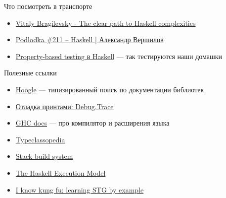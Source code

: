     \begin{frame}{Что посмотреть в транспорте}
        \begin{itemize}
            \item \href{https://youtu.be/n3H_YipBDrY?si=s1_yS-4r8JcZiuUi}{\color{blue} Vitaly Bragilevsky - The clear path to Haskell complexities}
            \item \href{https://youtu.be/sGFdbpGamWk}{\color{blue} Podlodka \#211 – Haskell | Александр Вершилов}
            \item \href{https://youtu.be/ndfLLz-wehE?si=A53s_VYg-UWJVWkW}{\color{blue}  Property-based testing в Haskell} --- так тестируются наши домашки
        \end{itemize}
    \end{frame}

    \begin{frame}{Полезные ссылки}
        \begin{itemize}
            \item \href{https://hoogle.haskell.org/}{\color{blue} Hoogle} --- типизированный поиск по документации библиотек
            \item \href{https://hackage.haskell.org/package/base-4.18.1.0/docs/Debug-Trace.html}{\color{blue} Отладка принтами: Debug.Trace}
            \item \href{https://ghc.gitlab.haskell.org/ghc/doc/users_guide/index.html}{\color{blue} GHC docs} --- про компилятор и расширения языка
            \item \href{https://wiki.haskell.org/Typeclassopedia}{\color{blue} Typeclassopedia}
            \item \href{https://docs.haskellstack.org/en/stable/}{\color{blue} Stack build system}
            \item \href{https://gitlab.haskell.org/ghc/ghc/-/wikis/commentary/rts/haskell-execution}{\color{blue} The Haskell Execution Model}
            \item \href{https://gitlab.haskell.org/ghc/ghc/-/wikis/commentary/compiler/generated-code}{\color{blue} I know kung fu: learning STG by example}
        \end{itemize}
    \end{frame}

